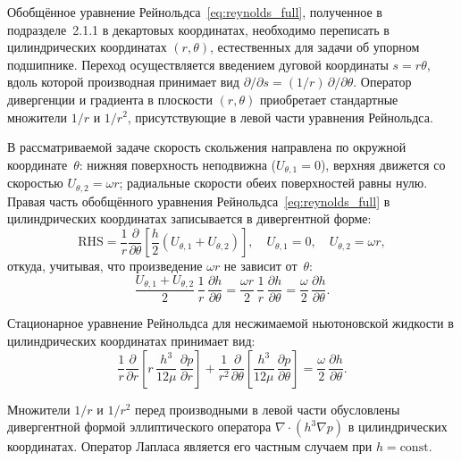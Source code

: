 Обобщённое уравнение Рейнольдса~\eqref{eq:reynolds_full}, полученное в подразделе~2.1.1 в декартовых координатах, необходимо переписать в цилиндрических координатах $(r, \theta)$, естественных для задачи об упорном подшипнике. Переход осуществляется введением дуговой координаты $s = r\theta$, вдоль которой производная принимает вид $\partial/\partial s = (1/r)\,\partial/\partial\theta$. Оператор дивергенции и градиента в плоскости $(r, \theta)$ приобретает стандартные множители $1/r$ и $1/r^2$, присутствующие в левой части уравнения Рейнольдса.

В рассматриваемой задаче скорость скольжения направлена по окружной координате~$\theta$: нижняя поверхность неподвижна ($U_{\theta,1} = 0$), верхняя движется со скоростью $U_{\theta,2} = \omega r$; радиальные скорости обеих поверхностей равны нулю. Правая часть обобщённого уравнения Рейнольдса~\eqref{eq:reynolds_full} в цилиндрических координатах записывается в дивергентной форме:
\begin{equation}
\mathrm{RHS} = \frac{1}{r}\frac{\partial}{\partial\theta}\!\left[\frac{h}{2}
(U_{\theta,1} + U_{\theta,2})\right], \quad U_{\theta,1} = 0,\quad U_{\theta,2} = \omega r,
\label{eq:thrust_rhs_div}
\end{equation}
откуда, учитывая, что произведение $\omega r$ не зависит от~$\theta$:
\begin{equation}
\frac{U_{\theta,1} + U_{\theta,2}}{2}\,\frac{1}{r}\,\frac{\partial h}{\partial \theta} = \frac{\omega r}{2}\,\frac{1}{r}\,\frac{\partial h}{\partial \theta} = \frac{\omega}{2}\,\frac{\partial h}{\partial \theta}.
\label{eq:thrust_rhs_derivation}
\end{equation}

Стационарное уравнение Рейнольдса для несжимаемой ньютоновской жидкости в цилиндрических координатах принимает вид:
\begin{equation}
\label{eq:thrust_reynolds}
\frac{1}{r}\frac{\partial}{\partial r}\!\left[r\,\frac{h^3}{12\mu}\,\frac{\partial p}{\partial r}\right] + \frac{1}{r^2}\frac{\partial}{\partial \theta}\!\left[\frac{h^3}{12\mu}\,\frac{\partial p}{\partial \theta}\right] = \frac{\omega}{2}\,\frac{\partial h}{\partial \theta}.
\end{equation}

Множители $1/r$ и $1/r^2$ перед производными в левой части обусловлены дивергентной формой эллиптического оператора $\nabla \cdot (h^3 \nabla p)$ в цилиндрических координатах. Оператор Лапласа является его частным случаем при $h = \mathrm{const}$.

